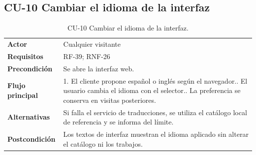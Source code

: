 \subsection{CU-10 Cambiar el idioma de la interfaz}

\begin{table}[H]
\centering
\begin{tabularx}{\textwidth}{p{}X}
\toprule
\textbf{Actor} & Cualquier visitante\\
\textbf{Requisitos} & RF-39; RNF-26\\
\textbf{Precondición} & Se abre la interfaz web.\\
\textbf{Flujo principal} & 1. El cliente propone español o inglés según el navegador.\newline
2. El usuario cambia el idioma con el selector.\newline
3. La preferencia se conserva en visitas posteriores.\\
\textbf{Alternativas} & Si falla el servicio de traducciones, se utiliza el catálogo local de referencia y se informa del límite.\\
\textbf{Postcondición} & Los textos de interfaz muestran el idioma aplicado sin alterar el catálogo ni los trabajos.\\
\bottomrule
\end{tabularx}
\caption{CU-10 Cambiar el idioma de la interfaz.}
\label{tabla:cu-idioma}
\end{table}
